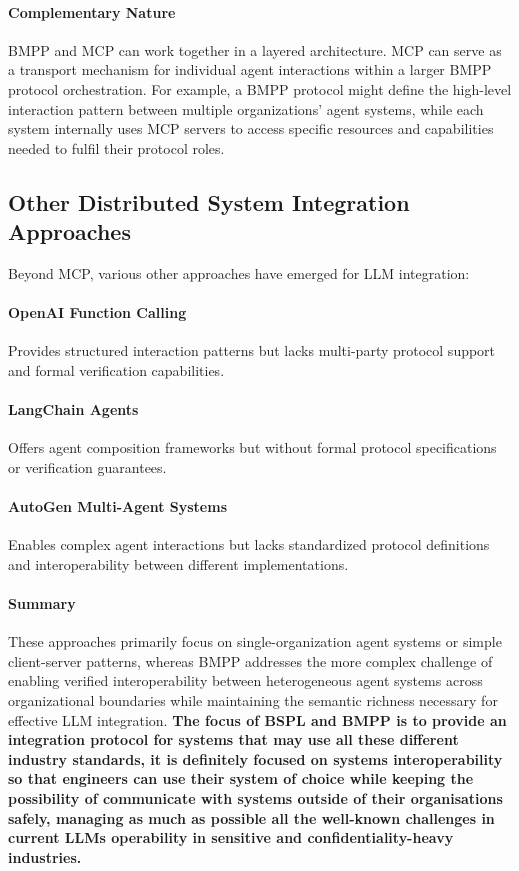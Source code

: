 \documentclass[11pt,a4paper]{article}
\begin{document}
	\paragraph{Complementary Nature} BMPP and MCP can work together in a layered architecture. MCP can serve as a transport mechanism for individual agent interactions within a larger BMPP protocol orchestration. For example, a BMPP protocol might define the high-level interaction pattern between multiple organizations' agent systems, while each system internally uses MCP servers to access specific resources and capabilities needed to fulfil their protocol roles.
	
	\subsection{Other Distributed System Integration Approaches}
	\label{subsec:other-approaches}
	
	Beyond MCP, various other approaches have emerged for LLM integration:
	
	\paragraph{OpenAI Function Calling} Provides structured interaction patterns but lacks multi-party protocol support and formal verification capabilities.
	
	\paragraph{LangChain Agents} Offers agent composition frameworks but without formal protocol specifications or verification guarantees.
	
	\paragraph{AutoGen Multi-Agent Systems} Enables complex agent interactions but lacks standardized protocol definitions and interoperability between different implementations.
	
	\paragraph{Summary}
	These approaches primarily focus on single-organization agent systems or simple client-server patterns, whereas BMPP addresses the more complex challenge of enabling verified interoperability between heterogeneous agent systems across organizational boundaries while maintaining the semantic richness necessary for effective LLM integration. \textbf{The focus of BSPL and BMPP is to provide an integration protocol for systems that may use all these different industry standards, it is definitely focused on systems interoperability so that engineers can use their system of choice while keeping the possibility of communicate with systems outside of their organisations safely, managing as much as possible all the well-known challenges \cite{shanmugarasa2025privacy} in current LLMs operability in sensitive and confidentiality-heavy industries.}
\end{document}
